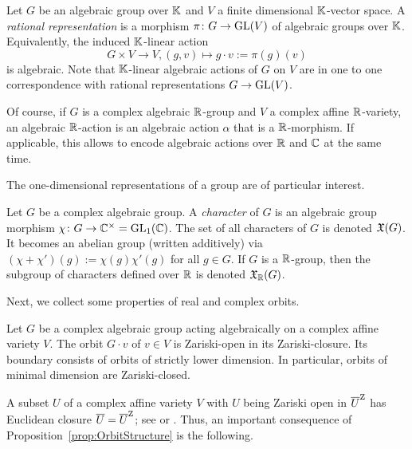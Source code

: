 \begin{defn} \label{defn:RationalRepresentation}
	Let $G$ be an algebraic group over $\mathbb K$ and $V$ a finite dimensional $\mathbb K$-vector space. A \emph{rational representation} is a morphism $\pi \colon G \to \operatorname{GL}(V)$ of algebraic groups over $\mathbb K$. Equivalently, the induced $\mathbb K$-linear action
		\[ G \times V \to V, (g,v) \mapsto g \cdot v := \pi(g)(v) \]
	is algebraic. Note that $\mathbb K$-linear algebraic actions of $G$ on $V$ are in one to one correspondence with rational representations $G \to \operatorname{GL}(V)$.
	\hfill{}
\end{defn}

Of course, if $G$ is a complex algebraic $\mathbb R$-group and $V$ a complex affine $\mathbb R$-variety, an algebraic $\mathbb R$-action is an algebraic action $\alpha$ that is a $\mathbb R$-morphism. If applicable, this allows to encode algebraic actions over $\mathbb R$ and $\mathbb C$ at the same time.

The one-dimensional representations of a group are of particular interest.

\begin{defn}[Character] \label{defn:Character}
	Let $G$ be a complex algebraic group. A \emph{character} of $G$ is an algebraic group morphism $\chi \colon G \to \mathbb C^\times = \operatorname{GL}_1(\mathbb C)$. The set of all characters of $G$ is denoted $\mathfrak{X}(G)$. It becomes an abelian group (written additively) via $(\chi + \chi')(g) := \chi(g)\chi'(g)$ for all $g \in G$.
	If $G$ is a $\mathbb R$-group, then the subgroup of characters defined over $\mathbb R$ is denoted $\mathfrak{X}_{\mathbb R}(G)$.
	\hfill{}
\end{defn}

Next, we collect some properties of real and complex orbits.

\begin{prop} \label{prop:OrbitStructure}
	Let $G$ be a complex algebraic group acting algebraically on a complex affine variety $V$. The orbit $G \cdot v$ of $v \in V$ is Zariski-open in its Zariski-closure. Its boundary consists of orbits of strictly lower dimension. In particular, orbits of minimal dimension are Zariski-closed.
\end{prop}

A subset $U$ of a complex affine variety $V$ with $U$ being Zariski open in $\overline{U}^{\operatorname{Z}}$ has Euclidean closure $\overline{U} = \overline{U}^{\operatorname{Z}}$; see \cite[Corollary~1.26]{Wallach} or \cite[Section~AI.7.2]{KraftBook}. Thus, an important consequence of Proposition~\ref{prop:OrbitStructure} is the following.

